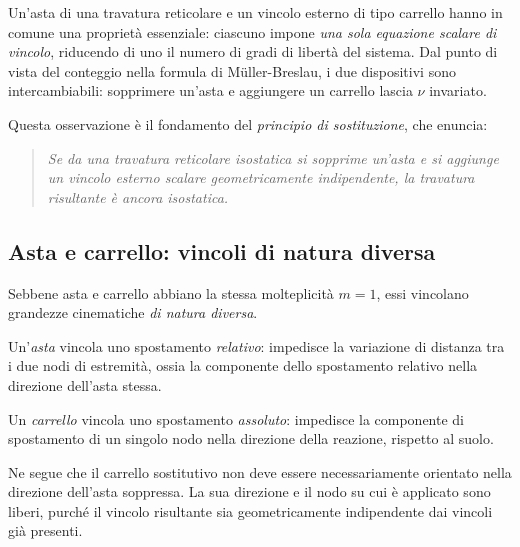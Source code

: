 Un'asta di una travatura reticolare e un vincolo
esterno di tipo carrello hanno in comune una proprietà
essenziale: ciascuno impone \emph{una sola equazione
	scalare di vincolo}, riducendo di uno il numero di
gradi di libertà del sistema. Dal punto di vista del
conteggio nella formula di M\"{u}ller-Breslau, i due
dispositivi sono intercambiabili: sopprimere un'asta
e aggiungere un carrello lascia $\nu$ invariato.

Questa osservazione è il fondamento del \emph{principio
	di sostituzione}, che enuncia:

\begin{quote}
	\itshape
	Se da una travatura reticolare isostatica si
	sopprime un'asta e si aggiunge un vincolo esterno
	scalare geometricamente indipendente, la travatura
	risultante è ancora isostatica.
\end{quote}

\subsection{Asta e carrello: vincoli di natura diversa}
\label{subsec:asta_vs_carrello}

Sebbene asta e carrello abbiano la stessa molteplicità
$m = 1$, essi vincolano grandezze cinematiche
\emph{di natura diversa}.

Un'\emph{asta} vincola uno spostamento \emph{relativo}:
impedisce la variazione di distanza tra i due nodi
di estremità, ossia la componente dello spostamento
relativo nella direzione dell'asta stessa.

Un \emph{carrello} vincola uno spostamento
\emph{assoluto}: impedisce la componente di
spostamento di un singolo nodo nella direzione della
reazione, rispetto al suolo.

Ne segue che il carrello sostitutivo non deve essere
necessariamente orientato nella direzione dell'asta
soppressa. La sua direzione e il nodo su cui è
applicato sono liberi, purché il vincolo risultante
sia geometricamente indipendente dai vincoli già
presenti.

